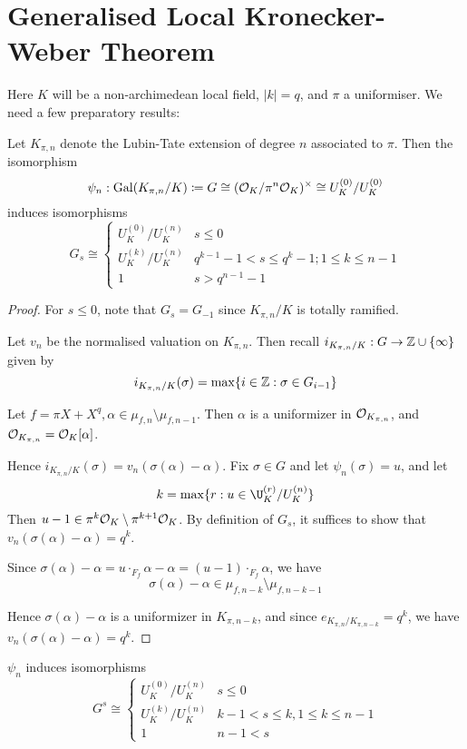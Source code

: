 \documentclass[10pt,a4paper]{article}
\begin{document}
\section{Generalised Local Kronecker-Weber Theorem}
Here $K$ will be a non-archimedean local field, $|k|=q$, and $\pi$ a uniformiser. We need a few preparatory results:
\begin{proposition}
  Let $K_{\pi,n}$ denote the Lubin-Tate extension of degree $n$ associated to $\pi$. Then the isomorphism
  \[\psi_n:\operatorname{Gal}(K_{\pi,n}/K)\coloneqq G \cong (\mathcal{O}_K/\pi^n\mathcal{O}_K)^\times \cong U_K^{(0)}/U_K^{(0)}\]
  induces isomorphisms
  \[G_s \cong \begin{cases} U_K^{(0)}/U_K^{(n)} & s \leq 0\\ U_K^{(k)}/U_K^{(n)} & q^{k-1}-1 < s \leq q^{k}-1; 1 \leq k \leq n-1 \\ 1 & s > q^{n-1}-1 \end{cases}\]
\end{proposition}
\begin{proof}
  For $s\leq 0$, note that $G_s = G_{-1}$ since $K_{\pi,n}/K$ is totally ramified.

  Let $v_n$ be the normalised valuation on $K_{\pi,n}$. Then recall $i_{K_{\pi,n}/K}:G \to \mathbb{Z}\cup\{\infty\}$ given by
  \[i_{K_{\pi,n}/K}(\sigma) = \max\{i\in\mathbb{Z} : \sigma \in G_{i-1}\}\]

  Let $f = \pi X + X^q, \alpha \in \mu_{f,n}\setminus \mu_{f,n-1}$. Then $\alpha$ is a uniformizer in $\mathcal{O}_{K_{\pi,n}}$, and $\mathcal{O}_{K_{\pi,n}} = \mathcal{O}_K[\alpha]$.

  Hence $i_{K_{\pi,n}/K}(\sigma) = v_n(\sigma(\alpha)-\alpha)$. Fix $\sigma \in G$ and let $\psi_n(\sigma)=u$, and let
  \[k =\max\{r : u \in \U_K^{(r)}/U_K^{(n)}\}\]
  Then $u-1 \in \pi^k\mathcal{O}_K\setminus \pi^{k+1}\mathcal{O}_K$. By definition of $G_s$, it suffices to show that $v_n(\sigma(\alpha)-\alpha) = q^k$.

  Since $\sigma(\alpha)-\alpha = u \cdot_{F_f}\alpha-\alpha = (u-1)\cdot_{F_f}\alpha$, we have
  \[\sigma(\alpha)-\alpha \in \mu_{f, n-k}\setminus \mu_{f, n-k-1}\]

  Hence $\sigma(\alpha)-\alpha$ is a uniformizer in $K_{\pi, n-k}$, and since $e_{K_{\pi,n}/K_{\pi,n-k}} = q^k$, we have $v_n(\sigma(\alpha)-\alpha) = q^k$.
\end{proof}
\begin{corollary}
  $\psi_n$ induces isomorphisms
  \[G^s \cong \begin{cases} U_K^{(0)}/U_K^{(n)} & s \leq 0\\ U_K^{(k)}/U_K^{(n)} &  k-1 < s \leq k, 1 \leq k \leq n-1\\ 1 & n-1<s\end{cases}\]
\end{corollary}
\end{document}
